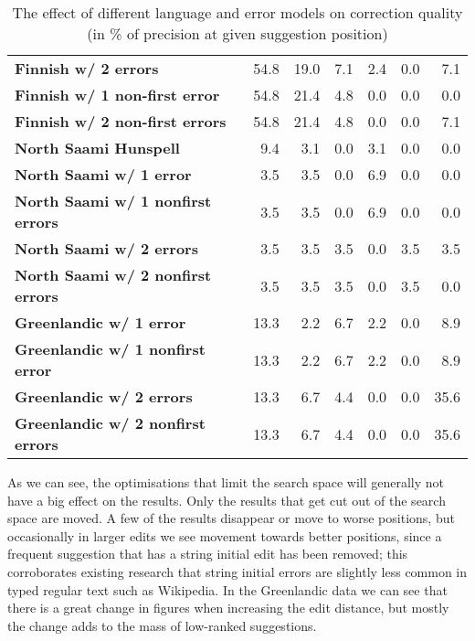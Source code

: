 \documentclass[a4paper,12pt]{article}
\begin{document}
\begin{table}
\begin{tabular}{|l|r|r|r|r|r|r|}
        \bf Finnish w/ 2 errors & 54.8 & 19.0 & 7.1 & 2.4 & 0.0 & 7.1 \\
\bf Finnish w/ 1 non-first error & 54.8 & 21.4 & 4.8 & 0.0 & 0.0 & 0.0 \\
\bf Finnish w/ 2 non-first errors & 54.8 & 21.4 & 4.8 & 0.0 & 0.0 & 7.1 \\
        \hline
        \bf North Saami Hunspell & 9.4 & 3.1 & 0.0 & 3.1 & 0.0 & 0.0 \\
        \hline
        \bf North Saami w/ 1 error & 3.5 & 3.5 & 0.0 & 6.9 & 0.0 & 0.0 \\
        \bf North Saami w/ 1 nonfirst errors & 3.5 & 3.5 & 0.0 & 6.9 & 0.0 & 0.0\\
        \bf North Saami w/ 2 errors & 3.5 & 3.5 & 3.5 & 0.0 & 3.5 & 3.5 \\
        \bf North Saami w/ 2 nonfirst errors & 3.5 & 3.5 & 3.5 & 0.0 & 3.5 & 0.0\\
        \hline
          \bf Greenlandic w/ 1 error & 13.3 & 2.2 & 6.7 & 2.2 & 0.0 & 8.9 \\
 \bf Greenlandic w/ 1 nonfirst error & 13.3 & 2.2 & 6.7 & 2.2 & 0.0 & 8.9 \\
         \bf Greenlandic w/ 2 errors & 13.3 & 6.7 & 4.4 & 0.0 & 0.0 & 35.6 \\
\bf Greenlandic w/ 2 nonfirst errors & 13.3 & 6.7 & 4.4 & 0.0 & 0.0 & 35.6 \\
        \hline
    \end{tabular}
    \caption{The effect of different language and error models on correction 
        quality (in \% of precision at given suggestion position)
    \label{table:quality}}
\end{table}

As we can see, the optimisations that limit the search space will generally not
have a big effect on the results. Only the results that get cut out of the
search space are moved. A few of the results disappear or move to worse
positions, but occasionally in larger edits we see movement towards better
positions, since a frequent suggestion that has a string initial edit has been
removed; this corroborates existing research that string initial errors are
slightly less common in typed regular text such as Wikipedia.
In the Greenlandic data we can see that there is a great change in figures
when increasing the edit distance, but mostly the change adds to the mass of
low-ranked suggestions. 
\end{document}
